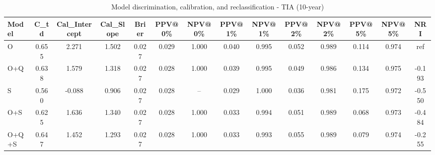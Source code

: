 \begin{table}[htbp]
\centering
\small
\caption{Model discrimination, calibration, and reclassification - TIA (10-year)}
\label{tab:perf_tia_10y}
\begin{tabular}{lccccccccccccc}
\toprule
Model & C\_td & Cal\_Intercept & Cal\_Slope & Brier & PPV@0\% & NPV@0\% & PPV@1\% & NPV@1\% & PPV@2\% & NPV@2\% & PPV@5\% & NPV@5\% & NRI \\
\midrule
O & 0.655 & 2.271 & 1.502 & 0.027 & 0.029 & 1.000 & 0.040 & 0.995 & 0.052 & 0.989 & 0.114 & 0.974 & ref \\
O+Q & 0.638 & 1.579 & 1.318 & 0.027 & 0.028 & 1.000 & 0.039 & 0.995 & 0.049 & 0.986 & 0.134 & 0.975 & -0.193 \\
S & 0.560 & -0.088 & 0.906 & 0.027 & 0.028 & -- & 0.029 & 1.000 & 0.036 & 0.981 & 0.175 & 0.972 & -0.550 \\
O+S & 0.625 & 1.636 & 1.340 & 0.027 & 0.028 & 1.000 & 0.033 & 0.994 & 0.051 & 0.989 & 0.068 & 0.973 & -0.484 \\
O+Q+S & 0.647 & 1.452 & 1.293 & 0.027 & 0.028 & 1.000 & 0.033 & 0.993 & 0.055 & 0.989 & 0.079 & 0.974 & -0.255 \\
\bottomrule
\end{tabular}
\end{table}